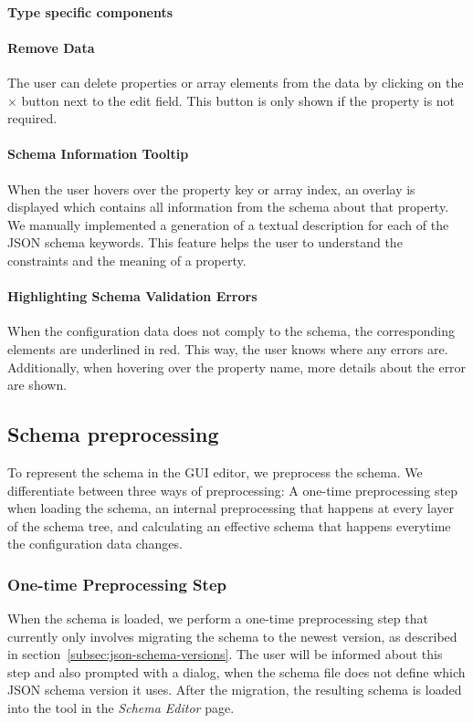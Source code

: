 
\paragraph{Type specific components}


\paragraph{Remove Data}
The user can delete properties or array elements from the data by clicking on the $\times$ button next to the edit field.
This button is only shown if the property is not required.

\paragraph{Schema Information Tooltip}
When the user hovers over the property key or array index, an overlay is displayed which contains all information from the schema about that property.
We manually implemented a generation of a textual description for each of the JSON schema keywords.
This feature helps the user to understand the constraints and the meaning of a property.

\paragraph{Highlighting Schema Validation Errors}
When the configuration data does not comply to the schema, the corresponding elements are underlined in red.
This way, the user knows where any errors are.
Additionally, when hovering over the property name, more details about the error are shown.

\subsection{Schema preprocessing}\label{subsec:schema-preprocessing}

To represent the schema in the GUI editor, we preprocess the schema.
We differentiate between three ways of preprocessing:
A one-time preprocessing step when loading the schema, an internal preprocessing that happens at every layer of the schema tree,
and calculating an effective schema that happens everytime the configuration data changes.

\subsubsection{One-time Preprocessing Step}
When the schema is loaded, we perform a one-time preprocessing step that currently only involves migrating the schema to the newest version,
as described in section~\ref{subsec:json-schema-versions}.
The user will be informed about this step and also prompted with a dialog, when the schema file does not define which JSON schema version it uses.
After the migration, the resulting schema is loaded into the tool in the \textit{Schema Editor} page.

